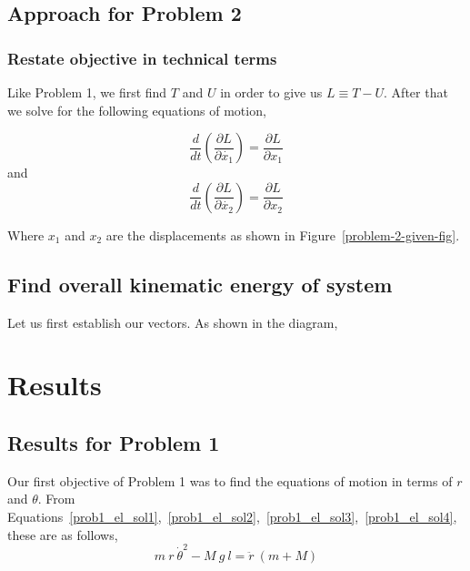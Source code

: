 \documentclass[conference]{IEEEtran}
\begin{document}
\subsection{Approach for Problem 2}

\subsubsection{Restate objective in technical terms}
Like Problem 1, we first find $T$ and $U$ in order to give us
$L \equiv T - U$. After that we solve for the following
equations of motion,

\begin{equation} \label{prob2_eq_motion_x1}
    \frac{d}{dt} \left(\frac{\partial L}{\partial \dot{x_1}}\right) = \frac{\partial L}{ \partial x_1}
\end{equation}
and
\begin{equation} \label{prob2_eq_motion_x2}
    \frac{d}{dt} \left(\frac{\partial L}{\partial \dot{x_2}}\right) = \frac{\partial L}{ \partial x_2}
\end{equation}

Where $x_1$ and $x_2$ are the displacements as shown in Figure~\ref{problem-2-given-fig}.

\subsection{Find overall kinematic energy of system}

Let us first establish our vectors. As shown in the diagram, 

\section{Results}

\subsection{Results for Problem 1}

Our first objective of Problem 1 was to find the equations of motion in terms
of $r$ and $\theta$. From Equations~\ref{prob1_el_sol1},~\ref{prob1_el_sol2},~\ref{prob1_el_sol3},~\ref{prob1_el_sol4}, these are as follows,\\

\begin{equation}\label{prob1_result_el1}
    \boxed{
        m~r~\dot{\theta}^2 - M~g~l = \ddot{r}~(m + M)
    }
\end{equation}
\end{document}
